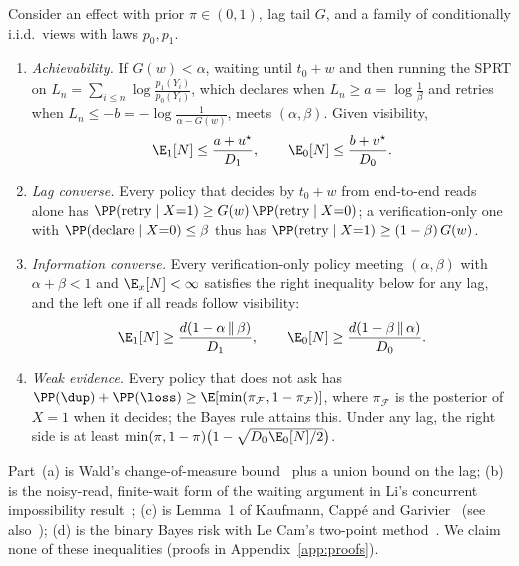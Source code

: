 \begin{theorem}
\label{thm:main}
Consider an effect with prior $\pi\in(0,1)$, lag tail $G$, and a family of conditionally i.i.d.\ views with laws $p_0,p_1$.
\begin{enumerate}[leftmargin=*,label=(\alph*),topsep=1pt,itemsep=1pt]
\item \emph{Achievability.} If $G(w)<\alpha$, waiting until $t_0+w$ and then running the SPRT on $L_n=\sum_{i\le n}\log\frac{p_1(Y_i)}{p_0(Y_i)}$, which declares when
$L_n\ge a=\log\frac1\beta$ and retries when $L_n\le-b=-\log\frac{1}{\alpha-G(w)}$, meets $(\alpha,\beta)$. Given visibility,
\begin{equation}
\E_1[N]\le\frac{a+u^\star}{D_1},\qquad \E_0[N]\le\frac{b+v^\star}{D_0}.
\label{eq:ub}
\end{equation}
\item \emph{Lag converse.} Every policy that decides by $t_0+w$ from end-to-end reads alone has $\PP(\text{retry}\mid X{=}1)\ge G(w)\,\PP(\text{retry}\mid X{=}0)$;
a verification-only one with $\PP(\text{declare}\mid X{=}0)\le\beta$ thus has $\PP(\text{retry}\mid X{=}1)\ge(1-\beta)\,G(w)$.
\item \emph{Information converse.} Every verification-only policy meeting $(\alpha,\beta)$ with $\alpha+\beta<1$ and $\E_x[N]<\infty$ satisfies the right inequality
below for any lag, and the left one if all reads follow visibility:
\begin{equation}
\E_1[N]\ge\frac{d(1-\alpha\,\|\,\beta)}{D_1},\qquad \E_0[N]\ge\frac{d(1-\beta\,\|\,\alpha)}{D_0}.
\label{eq:lb}
\end{equation}
\item \emph{Weak evidence.} Every policy that does not ask has $\PP(\dup)+\PP(\loss)\ge\E[\min(\pi_{\mathcal F},1-\pi_{\mathcal F})]$, where $\pi_{\mathcal F}$ is the posterior
of $X{=}1$ when it decides; the Bayes rule attains this. Under any lag, the right side is at least $\min(\pi,1-\pi)\big(1-\sqrt{D_0\E_0[N]/2}\big)$.
\end{enumerate}
\end{theorem}

 Part~(a) is Wald's change-of-measure bound~\cite{wald1945sprt} plus a union bound on the lag; (b) is the noisy-read, finite-wait form of the
waiting argument in Li's concurrent impossibility result~\cite{li2026exactlyonce}; (c) is Lemma~1 of Kaufmann, Capp\'e and Garivier~\cite{kaufmann2016complexity}
(see also~\cite{tartakovsky2014sequential}); (d) is the binary Bayes risk with Le Cam's two-point method~\cite{tsybakov2009nonparametric}. We claim none of these inequalities
(proofs in Appendix~\ref{app:proofs}).

